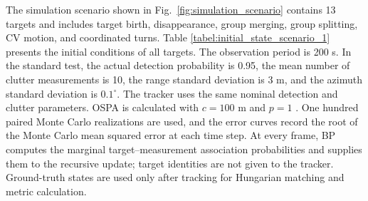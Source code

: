 \documentclass[10pt,doublecolumn]{IEEEtaes}
\begin{document}
The simulation scenario shown in Fig.~\ref{fig:simulation_scenario} contains 13 targets and includes target birth, disappearance, group merging, group splitting, CV motion, and coordinated turns. Table \ref{tabel:initial_state_scenario_1} presents the initial conditions of all targets. The observation period is 200 s. In the standard test, the actual detection probability is 0.95, the mean number of clutter measurements is 10, the range standard deviation is 3 m, and the azimuth standard deviation is $0.1^{\circ}$. The tracker uses the same nominal detection and clutter parameters. OSPA is calculated with $c=100$ m and $p=1$ \cite{schuhmacher2008consistent}. One hundred paired Monte Carlo realizations are used, and the error curves record the root of the Monte Carlo mean squared error at each time step. At every frame, BP computes the marginal target--measurement association probabilities and supplies them to the recursive update; target identities are not given to the tracker. Ground-truth states are used only after tracking for Hungarian matching and metric calculation.
\end{document}
